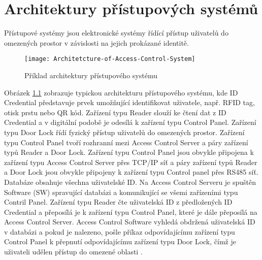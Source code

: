 \chapter{Architektury přístupových systémů}

Přístupové systémy jsou elektronické systémy řídící přístup uživatelů do omezených prostor v závislosti na jejich prokázané identitě.
 
\begin{figure}[!h]
    \centering
    \texttt{[image: Architetcture-of-Access-Control-System]}
    \caption{Příklad architektury přístupového systému \cite{accessControlSystem_eiprocus}}
    \label{fig:Access control system architecture}
\end{figure}

Obrázek \ref{fig:Access control system architecture} zobrazuje typickou architekturu přístupového systému, kde ID Credential představuje prvek umožňující identifikovat uživatele, např. RFID tag, otisk prstu nebo QR kód. 
Zařízení typu Reader slouží ke čtení dat z ID Credential a v digitální podobě je odesílá k zařízení typu Control Panel.
Zařízení typu Door Lock řídí fyzický přístup uživatelů do omezených prostor. 
Zařízení typu Control Panel tvoří rozhranní mezi Access Control Server a páry zařízení typů Reader a Door Lock. 
Zařízení typu Control Panel jsou obvykle připojena 
k zařízení typu Access Control Server přes TCP/IP síť a páry zařízení typů Reader a Door Lock jsou obvykle připojeny k zařízení typu Control panel přes RS485 síť. Databáze obsahuje všechna uživatelské ID.
Na Access Control Serveru je spuštěn Software (SW) spravující databázi a komunikující se všemi zařízeními typu Contril Panel.
Zařízení typu Reader čte uživatelská ID z předložených ID Credential a přeposílá je k zařízení typu Control Panel, které je dále přeposílá na Access Control Server. 
Access Control Software vyhledá obdržená uživatelská ID v databázi a pokud je nalezeno, pošle příkaz odpovídajícímu zařízení typu Control Panel k přepnutí odpovídajícímu zařízení typu Door Lock, čímž je uživateli udělen přístup do omezené oblasti \cite{accessControlSystem_eiprocus}.
